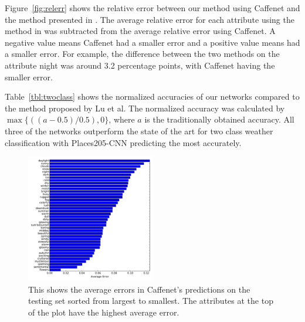\documentclass{article}
\newcommand{\figref}[1]{Figure~\ref{fig:#1}}
\newcommand{\tblref}[1]{Table~\ref{tbl:#1}}
\begin{document}
\figref{relerr} shows the relative error between our method using Caffenet
and the method presented in \cite{Laffont14}.  The average relative error 
for each attribute using the method in \cite{Laffont14} was subtracted from
the average relative error using Caffenet.  A negative value means Caffenet
had a smaller error and a positive value means \cite{Laffont14} had a smaller
error.  For example, the difference between the two methods on the attribute
night was around 3.2 percentage points, with Caffenet having the smaller 
error.

\tblref{twoclass} shows the normalized accuracies of our networks compared to 
the method proposed by Lu\cite{lutwoclass} et al.  The normalized accuracy was
calculated by $ \max\{((a - 0.5) / 0.5), 0\} $, where $a$ is the traditionally
obtained accuracy. All three of the networks outperform the state of the art for
two class weather classification with Places205-CNN predicting the most 
accurately.

 
 
%
%
%

\begin{figure}[t]
	\centering
		\includegraphics[width=0.5\textwidth]{figs/sorted_err.pdf}
		\caption{This shows the average errors in Caffenet's predictions on the 
						 testing set sorted from largest to smallest.  The attributes at 
						 the top of the plot have the highest average error.}
		\label{fig:sort}
\end{figure}
\end{document}
